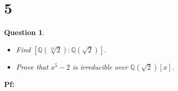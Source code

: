 \documentclass{article}
\newtheorem{question}{Question}
\begin{document}
\break

\section*{5}
\begin{myBox}[]{}
    \begin{question}

        \hfil

        \begin{itemize}
            \item[(a)] Find $[\mathbb{Q}(\sqrt[10]{2}):\mathbb{Q}(\sqrt{2})]$.
            \item[(b)] Prove that $x^5-2$ is irreducible over $\mathbb{Q}(\sqrt{2})[x]$. 
        \end{itemize}
    \end{question}
\end{myBox}

\textbf{Pf:}
\end{document}
